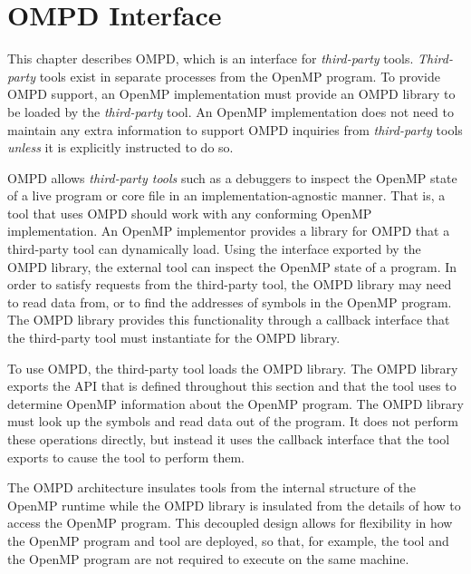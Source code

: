 \chapter{OMPD Interface}
\label{sec:OMPD Interface}
\label{chap:OMPD Interface}
\label{sec:ompd-overview}

This chapter describes OMPD, which is an interface for \emph{third-party} tools.
\emph{Third-party} tools exist in separate processes from the OpenMP program.
To provide OMPD support, an OpenMP implementation must provide an OMPD library to
be loaded by the \emph{third-party} tool. An OpenMP implementation does not need
to maintain any extra information to support OMPD inquiries from \emph{third-party}
tools \emph{unless} it is explicitly instructed to do so.

OMPD allows \emph{third-party tools} such as a debuggers to inspect the 
OpenMP state of a live program or core file in an implementation-agnostic 
manner. That is, a tool that uses OMPD should work with any conforming 
OpenMP implementation. An OpenMP implementor provides a library for OMPD 
that a third-party tool can dynamically load. Using the interface exported 
by the OMPD library, the external tool can inspect the OpenMP state of a 
program. In order to satisfy requests from the third-party tool, the OMPD 
library may need to read data from, or to find the addresses of symbols in 
the OpenMP program. The OMPD library provides this functionality through a 
callback interface that the third-party tool must instantiate for the OMPD library.

To use OMPD, the third-party tool loads the OMPD library. The OMPD library exports 
the API that is defined throughout this section and that the tool uses to 
determine OpenMP information about the OpenMP program. The OMPD library must
look up the symbols and read data out of the program. It does not perform
these operations directly, but instead it uses the callback interface that the
tool exports to cause the tool to perform them.

The OMPD architecture insulates tools from the internal structure of the 
OpenMP runtime while the OMPD library is insulated from the details of how 
to access the OpenMP program. This decoupled design allows for flexibility in how 
the OpenMP program and tool are deployed, so that, for example, the tool and the 
OpenMP program are not required to execute on the same machine.


